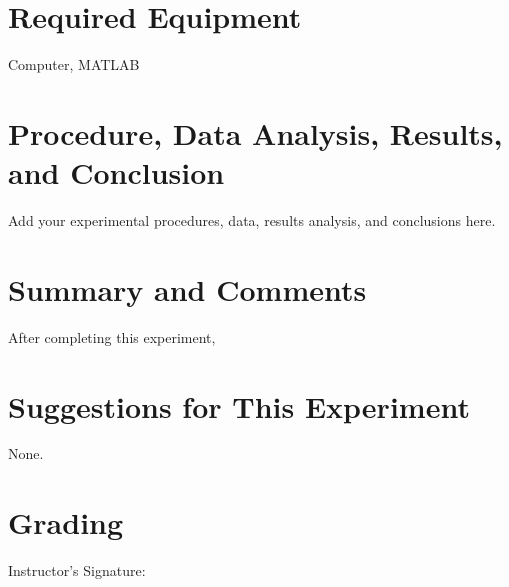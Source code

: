 \documentclass[12pt]{article}
\begin{document}
\section{Required Equipment}
Computer, MATLAB

\section{Procedure, Data Analysis, Results, and Conclusion}
Add your experimental procedures, data, results analysis, and conclusions here.

\section{Summary and Comments}
After completing this experiment,

\section{Suggestions for This Experiment}
None.

\section{Grading}
\bigskip

\begin{flushright}
Instructor's Signature:
\end{flushright}
\end{document}
